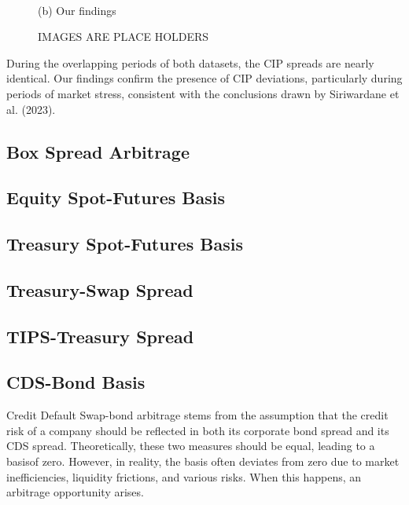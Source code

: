 \documentclass{article}
\begin{document}
\begin{figure}[htbp]
\begin{minipage}[b]{0.48\textwidth}
    \\[1ex]
    {\small (b) Our findings}
  \end{minipage}
  \caption{IMAGES ARE PLACE HOLDERS}
  \label{fig:comparison-minipage}
\end{figure}

During the overlapping periods of both datasets, the CIP spreads are nearly identical.
Our findings confirm the presence of CIP deviations, particularly during periods of
market stress, consistent with the conclusions drawn by Siriwardane et al. (2023).


\subsection{Box Spread Arbitrage}

\subsection{Equity Spot-Futures Basis}

\subsection{Treasury Spot-Futures Basis}

\subsection{Treasury-Swap Spread}

\subsection{TIPS-Treasury Spread}

\subsection{CDS-Bond Basis}

Credit Default Swap-bond arbitrage stems from the assumption that the credit risk of a company should 
be reflected in both its corporate bond spread and its CDS spread. 
Theoretically, these two measures should be equal, leading to a basisof zero. 
However, in reality, the basis often deviates from zero due to market inefficiencies, 
liquidity frictions, and various risks. When this happens, an arbitrage opportunity arises.
\end{document}

